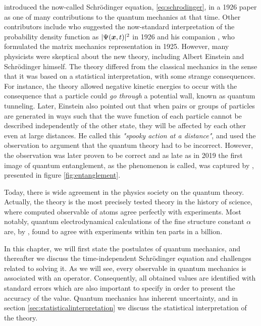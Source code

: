 \citet{schrodinger_undulatory_1926} introduced the now-called Schrödinger equation, \eqref{eq:schrodinger}, in a 1926 paper as one of many contributions to the quantum mechanics at that time. Other contributors include \citet{born_zur_1926} who suggested the now-standard interpretation of the probability density function as $|\Psi(\boldsymbol{{x}},t)|^2$ in 1926 and his companion \citet{heisenberg_uber_1925}, who formulated the matrix mechanics representation in 1925. However, many physicists were skeptical about the new theory, including Albert Einstein and Schrödinger himself. The theory differed from the classical mechanics in the sense that it was based on a statistical interpretation, with some strange consequences. For instance, the theory allowed negative kinetic energies to occur with the consequence that a particle could \textit{go through} a potential wall, known as quantum tunneling. Later, Einstein \supercite{einstein_can_1935} also pointed out that when pairs or groups of particles are generated in ways such that the wave function of each particle cannot be described independently of the other state, they will be affected by each other even at large distances. He called this \textit{"spooky action at a distance"}, and used the observation to argument that the quantum theory had to be incorrect. However, the observation was later proven to be correct and as late as in 2019 the first image of quantum entanglement, as the phenomenon is called, was captured by \citet{moreau_imaging_2019}, presented in figure \eqref{fig:entanglement}.

Today, there is wide agreement in the physics society on the quantum theory. Actually, the theory is the most precisely tested theory in the history of science, where computed observable of atoms agree perfectly with experiments. Most notably, quantum electrodynamical calculations of the fine structure constant $\alpha$ are, by \citet{odom_new_2006}, found to agree with experiments within ten parts in a billion.

In this chapter, we will first state the postulates of quantum mechanics, and thereafter we discuss the time-independent Schrödinger equation and challenges related to solving it. As we will see, every observable in quantum mechanics is associated with an operator. Consequently, all obtained values are identified with standard errors which are also important to specify in order to present the accuracy of the value. Quantum mechanics has inherent uncertainty, and in section \ref{sec:statisticalinterpretation} we discuss the statistical interpretation of the theory. 

